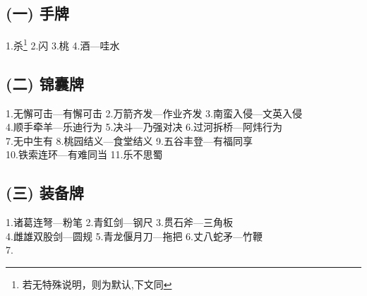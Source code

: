 \documentclass[UTF-8]{ctexart}
\begin{document}
\subsection*{(一)   手牌}
1.杀\footnote{若无特殊说明，则为默认,下文同} \hspace{1.0cm} 2.闪 \hspace{1.0cm} 3.桃 \hspace{1.0cm} 4.酒---哇水

\subsection*{(二)   锦囊牌}

\begin{flushleft}
1.无懈可击---有懈可击 \hspace{0.2cm} 2.万箭齐发---作业齐发 \hspace{0.2cm} 3.南蛮入侵---文英入侵\\
4.顺手牵羊---乐迪行为 \hspace{0.22cm} 5.决斗---乃强对决 \hspace{1cm} 6.过河拆桥---阿炜行为\\
7.无中生有 \hspace{2.05cm} 8.桃园结义---食堂结义 \hspace{0.2cm} 9.五谷丰登---有福同享\\
10.铁索连环---有难同当 \hspace{0.2cm} 11.乐不思蜀
\end{flushleft}

\subsection*{(三)   装备牌}

\begin{flushleft}
1.诸葛连弩---粉笔 \hspace{0.8cm} 2.青釭剑---钢尺 \hspace{1cm} 3.贯石斧---三角板\\
4.雌雄双股剑---圆规 \hspace{0.4cm} 5.青龙偃月刀---拖把 \hspace{0.8cm} 6.丈八蛇矛---竹鞭\\
7.
\end{flushleft}
\end{document}
